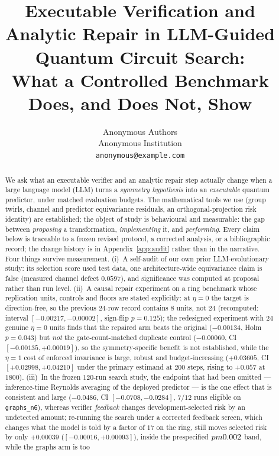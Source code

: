 \documentclass[11pt]{article}
\title{Executable Verification and Analytic Repair in LLM-Guided Quantum Circuit
Search:\\ What a Controlled Benchmark Does, and Does Not, Show}
\author{Anonymous Authors\\
Anonymous Institution\\
\texttt{anonymous@example.com}}
\begin{document}
\maketitle

\begin{abstract}
We ask what an executable verifier and an analytic repair step actually change when a
large language model (LLM) turns a \emph{symmetry hypothesis} into an \emph{executable}
quantum predictor, under matched evaluation budgets. The mathematical tools we use
(group twirls, channel and predictor equivariance residuals, an orthogonal-projection
risk identity) are established; the object of study is behavioural and measurable: the
gap between \emph{proposing} a transformation, \emph{implementing} it, and
\emph{performing}. Every claim below is traceable to a frozen revised protocol, a corrected
analysis, or a bibliographic record; the change history is in Appendix~\ref{app:audit} rather
than in the narrative. Four things survive measurement. (i)~A self-audit of our own prior
LLM-evolutionary study: its selection score used test data, one architecture-wide
equivariance claim is false (measured channel defect $0.0597$), and significance was
computed at proposal rather than run level. (ii)~A causal repair experiment on a ring
benchmark whose replication units, controls and floors are stated explicitly: at
$\eta{=}0$ the target is direction-free, so the previous $24$-row record contains $8$ units,
not $24$ (recomputed: interval $[-0.00217,-0.00002]$, sign-flip $p{=}0.125$); the redesigned
experiment with $24$ genuine $\eta{=}0$ units finds that the repaired arm beats the original
($-0.00134$, Holm $p{=}0.043$) but \emph{not} the gate-count-matched duplicate control
($-0.00060$, CI $[-0.00135,+0.00019]$), so the symmetry-specific benefit is not established,
while the $\eta{=}1$ cost of enforced invariance is large, robust and budget-increasing
($+0.03605$, CI $[+0.02998,+0.04210]$ under the primary estimand at $200$ steps, rising to
$+0.057$ at $1800$). (iii)~In the frozen $120$-run search study,
the endpoint that had been omitted --- inference-time Reynolds averaging of the deployed
predictor --- is the one effect that is consistent and large
($-0.0486$, CI $[-0.0708,-0.0284]$, $7/12$ runs eligible on \texttt{graphs\_n6}), whereas
verifier \emph{feedback} changes development-selected risk by an undetected amount; re-running
the search under a corrected feedback screen, which changes what the model is told by a factor of
$17$ on the ring, still moves selected risk by only $+0.00039$
($[-0.00016,+0.00093]$), inside the prespecified $\\pm0.002$ band, while the graphs arm is too

\end{abstract}
\end{document}
